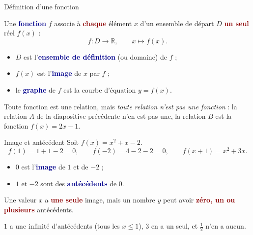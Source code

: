 \documentclass[aspectratio=169,11pt]{beamer}
\newcommand{\R}{\mathbb{R}}
\newcommand{\important}[1]{\textcolor{DarkRed}{\textbf{#1}}}
\newcommand{\key}[1]{\textcolor{DarkBlue}{\textbf{#1}}}
\begin{document}
\begin{frame}{Définition d'une fonction}
	\begin{definitionbox}
		Une \key{fonction} $f$ associe à \important{chaque} élément $x$ d'un ensemble de départ $D$ \important{un seul} réel $f(x)$ :
		\[ f : D \longrightarrow \R,\qquad x \longmapsto f(x). \]
	\end{definitionbox}
	\begin{itemize}
		\item $D$ est l'\key{ensemble de définition} (ou domaine) de $f$ ;
		\item $f(x)$ est l'\key{image} de $x$ par $f$ ;
		\item le \key{graphe} de $f$ est la courbe d'équation $y=f(x)$.
	\end{itemize}
	\begin{attentionbox}
		Toute fonction est une relation, mais \emph{toute relation n'est pas une fonction} : la relation $A$ de la diapositive précédente n'en est pas une, la relation $B$ est la fonction $f(x)=2x-1$.
	\end{attentionbox}
\end{frame}

\begin{frame}{Image et antécédent}
	Soit $f(x)=x^2+x-2$.
	\[ f(1)=1+1-2=0,\qquad f(-2)=4-2-2=0,\qquad f(x+1)=x^2+3x. \]
	\begin{itemize}
		\item $0$ est l'\key{image} de $1$ et de $-2$ ;
		\item $1$ et $-2$ sont des \key{antécédents} de $0$.
	\end{itemize}
	\begin{attentionbox}
		Une valeur $x$ a \important{une seule} image, mais un nombre $y$ peut avoir \important{zéro, un ou plusieurs} antécédents.
	\end{attentionbox}
	\vspace{0.1cm}
	\begin{exemplebox}[{Exemple : $f:\R\to\R_+,\ x\mapsto\max\{x,1\}$}]
		$1$ a une infinité d'antécédents (tous les $x\le1$), $3$ en a un seul, et $\tfrac12$ n'en a aucun.
	\end{exemplebox}
\end{frame}
\end{document}
